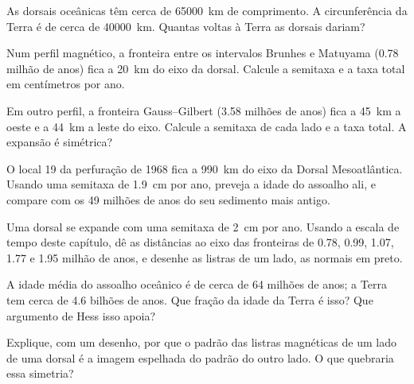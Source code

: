 \begin{exercise}[$\star$]\label{exo:g11:drift-to-spreading:5}
As dorsais oceânicas têm cerca de \qty{65000}{km} de comprimento. A
circunferência da Terra é de cerca de \qty{40000}{km}. Quantas voltas à
Terra as dorsais dariam?
\end{exercise}

\begin{exercise}[$\star\star$]\label{exo:g11:drift-to-spreading:6}
Num perfil magnético, a fronteira entre os intervalos Brunhes e Matuyama
(\num{0.78} milhão de anos) fica a \qty{20}{km} do eixo da dorsal. Calcule a
semitaxa e a taxa total em centímetros por ano.
\end{exercise}

\begin{exercise}[$\star\star$]\label{exo:g11:drift-to-spreading:7}
Em outro perfil, a fronteira Gauss--Gilbert (\num{3.58} milhões de anos)
fica a \qty{45}{km} a oeste e a \qty{44}{km} a leste do eixo. Calcule a
semitaxa de cada lado e a taxa total. A expansão é simétrica?
\end{exercise}

\begin{exercise}[$\star\star$]\label{exo:g11:drift-to-spreading:8}
O local 19 da perfuração de 1968 fica a \qty{990}{km} do eixo da Dorsal
Mesoatlântica. Usando uma semitaxa de \qty{1.9}{cm} por ano, preveja a idade
do assoalho ali, e compare com os \num{49} milhões de anos do seu sedimento
mais antigo.
\end{exercise}

\begin{exercise}[$\star\star$]\label{exo:g11:drift-to-spreading:9}
Uma dorsal se expande com uma semitaxa de \qty{2}{cm} por ano. Usando a
escala de tempo deste capítulo, dê as distâncias ao eixo das fronteiras de
0.78, 0.99, 1.07, 1.77 e 1.95 milhão de anos, e desenhe as listras de um
lado, as normais em preto.
\end{exercise}

\begin{exercise}[$\star\star$]\label{exo:g11:drift-to-spreading:10}
A idade média do assoalho oceânico é de cerca de \num{64} milhões de anos; a
Terra tem cerca de \num{4.6} bilhões de anos. Que fração da idade da Terra é
isso? Que argumento de Hess isso apoia?
\end{exercise}

\begin{exercise}[$\star\star$]\label{exo:g11:drift-to-spreading:11}
Explique, com um desenho, por que o padrão das listras magnéticas de um lado
de uma dorsal é a imagem espelhada do padrão do outro lado. O que quebraria
essa simetria?
\end{exercise}

